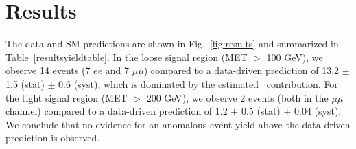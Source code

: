 
\section{Results}
\label{sec:results}

The data and SM predictions are shown in Fig.~\ref{fig:results} and summarized in Table~\ref{resultsyieldtable}.
In the loose signal region (MET $>$ 100 GeV), we observe 14 events (7 $ee$ and 7 $\mu\mu$)
compared to a data-driven prediction of 13.2 $\pm$ 1.5 (stat) $\pm$ 0.6 (syst),
which is dominated by the estimated \ttbar\ contribution. 
For the tight signal region (MET $>$ 200 GeV),
we observe 2 events (both in the $\mu\mu$ channel) compared to a 
data-driven prediction of 1.2 $\pm$ 0.5 (stat) $\pm$ 0.04 (syst).
We conclude that no evidence for an anomalous event yield above the data-driven prediction is observed.
